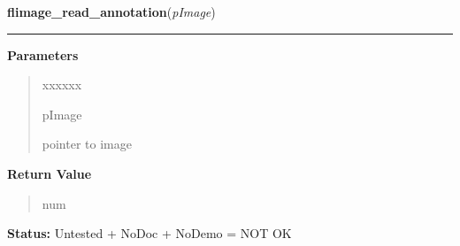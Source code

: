 \hspace{.8\funcindent}\begin{boxedminipage}{\funcwidth}

    \raggedright \textbf{flimage\_read\_annotation}(\textit{pImage})

    \vspace{-1.5ex}

    \rule{\textwidth}{0.5\fboxrule}
\setlength{\parskip}{2ex}
\setlength{\parskip}{1ex}
      \textbf{Parameters}
      \vspace{-1ex}

      \begin{quote}
        \begin{Ventry}{xxxxxx}

          \item[pImage]

          pointer to image

        \end{Ventry}

      \end{quote}

      \textbf{Return Value}
    \vspace{-1ex}

      \begin{quote}
      num

      \end{quote}

\textbf{Status:} Untested + NoDoc + NoDemo = NOT OK



    \end{boxedminipage}

    \label{xformslib:flflimage:flimage_replace_image}

    \vspace{0.5ex}

